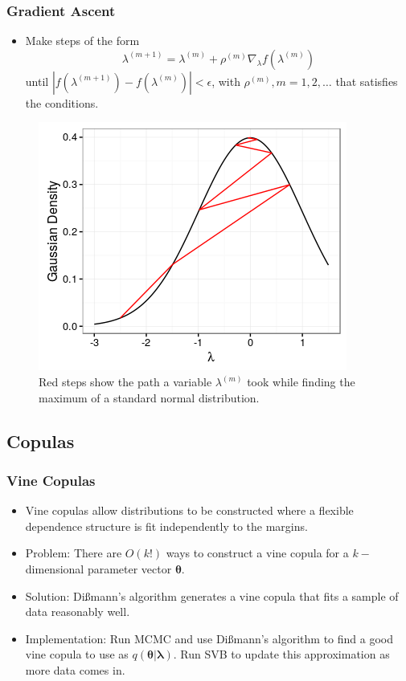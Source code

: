 \documentclass{beamer}\usepackage[]{graphicx}\usepackage[]{color}
\begin{document}
\begin{frame}
\frametitle{Gradient Ascent}
\begin{itemize}
\item Make steps of the form
\begin{equation}
\lambda^{(m+1)} = \lambda^{(m)} + \rho^{(m)} \nabla_{\lambda} f(\lambda^{(m)})
\end{equation}
until $| f(\lambda^{(m+1)}) - f(\lambda^{(m)}) | < \epsilon$, with $\rho^{(m)}, m = 1, 2, \dots$ that satisfies the \citet{Robbins1951} conditions.
\end{itemize}
\begin{figure}[h]
\centering
\includegraphics[scale = 0.4]{gradientascent}
\caption{Red steps show the path a variable $\lambda^{(m)}$ took while finding the maximum of a standard normal distribution.}
\label{fig:GradAscent}
\end{figure}
\end{frame}


\begin{frame}
\section{Copulas}
\frametitle{Vine Copulas}
\begin{itemize}
\item Vine copulas allow distributions to be constructed where a flexible dependence structure is fit independently to the margins.
\vspace{3mm}
\item Problem: There are $O(k!)$ ways to construct a vine copula for a $k-$dimensional parameter vector $\boldsymbol{\theta}$.
\item Solution: Di{\ss}mann's algorithm generates a vine copula that fits a sample of data reasonably well.
\item Implementation: Run MCMC and use Di{\ss}mann's algorithm to find a good vine copula to use as $q(\boldsymbol{\theta} | \boldsymbol{\lambda})$. Run SVB to update this approximation as more data comes in.
\end{itemize}
\end{frame}
\end{document}
